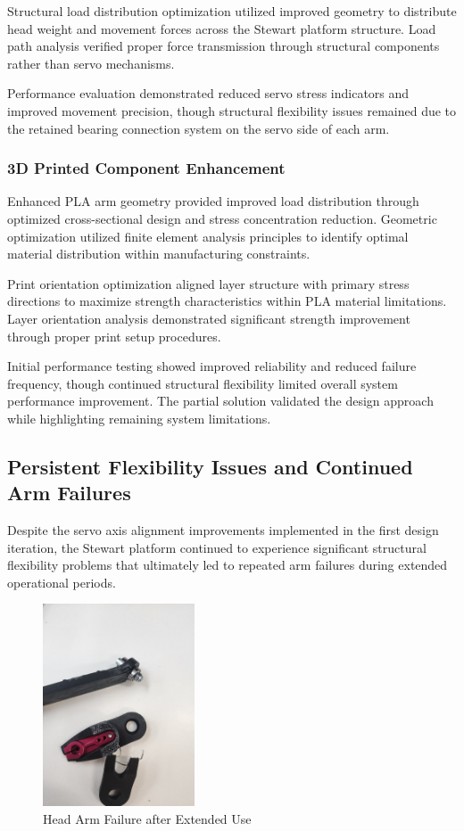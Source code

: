Structural load distribution optimization utilized improved geometry to distribute head weight and movement forces across the Stewart platform structure. Load path analysis verified proper force transmission through structural components rather than servo mechanisms.

Performance evaluation demonstrated reduced servo stress indicators and improved movement precision, though structural flexibility issues remained due to the retained bearing connection system on the servo side of each arm.

\subsubsection{ 3D Printed Component Enhancement}

Enhanced PLA arm geometry provided improved load distribution through optimized cross-sectional design and stress concentration reduction. Geometric optimization utilized finite element analysis principles to identify optimal material distribution within manufacturing constraints.

Print orientation optimization aligned layer structure with primary stress directions to maximize strength characteristics within PLA material limitations. Layer orientation analysis demonstrated significant strength improvement through proper print setup procedures.

Initial performance testing showed improved reliability and reduced failure frequency, though continued structural flexibility limited overall system performance improvement. The partial solution validated the design approach while highlighting remaining system limitations.

\subsection{Persistent Flexibility Issues and Continued Arm Failures}

Despite the servo axis alignment improvements implemented in the first design iteration, the Stewart platform continued to experience significant structural flexibility problems that ultimately led to repeated arm failures during extended operational periods.

\begin{figure}[H]
    \centering
    \includegraphics[height=6cm, angle=-90]{Images/HeadArmFailure (2).jpg}
    \caption{Head Arm Failure after Extended Use}
    \label{fig:head_arm_failure}
\end{figure}

